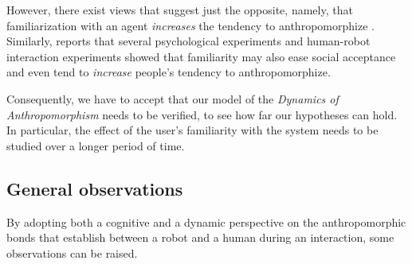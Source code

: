 \documentclass{frontiersSCNS} %
\begin{document}
However, there exist views that suggest just the opposite, namely, that familiarization with an agent \textit{increases} the tendency to anthropomorphize \citep{eddy_attribution_1993}. Similarly, \cite{duffy_anthropomorphism_2003} reports that several psychological experiments and human-robot interaction experiments showed that familiarity may also ease social acceptance and even tend to \textit{increase} people's tendency to anthropomorphize.

Consequently, we have to accept that our model of the \emph{Dynamics of Anthropomorphism} needs to be verified, to see how far our hypotheses can hold. In particular, the effect of the user's familiarity with the system needs to be studied over a longer period of time.



%
%

%



\subsection{General observations}

By adopting both a cognitive and a dynamic perspective on the anthropomorphic
bonds that establish between a robot and a human during an interaction, some
observations can be raised.
\end{document}
